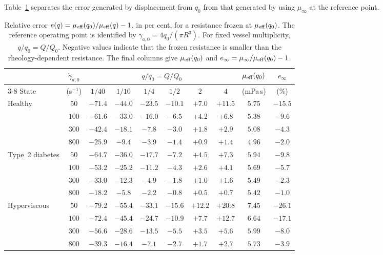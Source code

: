 \documentclass[lineno]{jfm}
\begin{document}
Table~\ref{tab:calibration-error} separates the error generated by displacement
from $q_0$ from that generated by using $\mu_\infty$ at the reference point.
\begin{table}
  \centering
  \caption{Relative error
  $e(q)=\mu_{\rm eff}(q_0)/\mu_{\rm eff}(q)-1$, in per cent, for a resistance
  frozen at $\mu_{\rm eff}(q_0)$. The reference operating point is identified
  by $\dot\gamma_{a,0}=4q_0/(\pi R^3)$. For fixed vessel multiplicity,
  $q/q_0=Q/Q_0$. Negative values indicate that the frozen resistance is smaller
  than the rheology-dependent resistance. The final columns give
  $\mu_{\rm eff}(q_0)$ and
  $e_\infty=\mu_\infty/\mu_{\rm eff}(q_0)-1$.}
  \label{tab:calibration-error}
  \begin{tabular}{lccccccccc}
    \toprule
    & $\dot\gamma_{a,0}$ & \multicolumn{6}{c}{$q/q_0=Q/Q_0$}
    & $\mu_{\rm eff}(q_0)$ & $e_\infty$ \\
    \cmidrule(lr){3-8}
    State & (s$^{-1}$)
    & $1/40$ & $1/10$ & $1/4$ & $1/2$ & $2$ & $4$
    & (mPa\,s) & (\%) \\
    \midrule
    Healthy
      & $50$  & $-71.4$ & $-44.0$ & $-23.5$ & $-10.1$ & $+7.0$ & $+11.5$ & $5.75$ & $-15.5$ \\
      & $100$ & $-61.6$ & $-33.0$ & $-16.0$ & $-6.5$  & $+4.2$ & $+6.8$  & $5.38$ & $-9.6$ \\
      & $300$ & $-42.4$ & $-18.1$ & $-7.8$  & $-3.0$  & $+1.8$ & $+2.9$  & $5.08$ & $-4.3$ \\
      & $800$ & $-25.9$ & $-9.4$  & $-3.9$  & $-1.4$  & $+0.9$ & $+1.4$  & $4.96$ & $-2.0$ \\
    \addlinespace
    Type~2 diabetes
      & $50$  & $-64.7$ & $-36.0$ & $-17.7$ & $-7.2$ & $+4.5$ & $+7.3$ & $5.94$ & $-9.8$ \\
      & $100$ & $-53.2$ & $-25.2$ & $-11.2$ & $-4.3$ & $+2.6$ & $+4.1$ & $5.69$ & $-5.7$ \\
      & $300$ & $-33.0$ & $-12.3$ & $-4.9$  & $-1.8$ & $+1.0$ & $+1.6$ & $5.49$ & $-2.3$ \\
      & $800$ & $-18.2$ & $-5.8$  & $-2.2$  & $-0.8$ & $+0.5$ & $+0.7$ & $5.42$ & $-1.0$ \\
    \addlinespace
    Hyperviscous
      & $50$  & $-79.2$ & $-55.4$ & $-33.1$ & $-15.6$ & $+12.2$ & $+20.8$ & $7.45$ & $-26.1$ \\
      & $100$ & $-72.4$ & $-45.4$ & $-24.7$ & $-10.9$ & $+7.7$  & $+12.7$ & $6.64$ & $-17.1$ \\
      & $300$ & $-56.6$ & $-28.6$ & $-13.5$ & $-5.5$  & $+3.5$  & $+5.6$  & $5.99$ & $-8.0$ \\
      & $800$ & $-39.3$ & $-16.4$ & $-7.1$  & $-2.7$  & $+1.7$  & $+2.7$  & $5.73$ & $-3.9$ \\
    \bottomrule
  \end{tabular}
\end{table}
\end{document}
